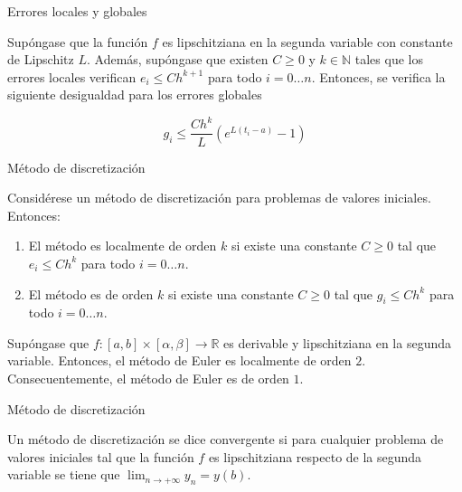 	
		\begin{frame}{Errores locales y globales}	
			\begin{theorem} \label{theorem:local-global-error}
				Supóngase que la función $f$ es lipschitziana en la segunda variable con constante de Lipschitz $L$. Además, supóngase que existen $C \ge 0$ y $k \in \mathbb{N}$ tales que los errores locales verifican $e_i \le C h^{k+1}$ para todo $i = 0 \ldots n$. Entonces, se verifica la siguiente desigualdad para los errores globales
						
				\begin{equation}
					g_i \le \frac{C h^k}{L} (e^{L(t_i-a)}-1)
				\end{equation}
			\end{theorem}
		\end{frame}	 
		
		\begin{frame}{Método de discretización}
			\fontsize{11}{11}\selectfont
			\begin{definition}
				Considérese un método de discretización para problemas de valores iniciales. Entonces:
				\begin{enumerate}
					\item El método es localmente de orden $k$ si existe una constante $C \ge 0$ tal que $e_i \le C h^k$ para todo $i = 0 \ldots n$.
					\item El método es de orden $k$ si existe una constante $C \ge 0$ tal que $g_i \le C h^k$ para todo $i = 0 \ldots n$.
				\end{enumerate}
			\end{definition}
			
			\begin{theorem} \label{theorem:euler:error}
				Supóngase que $f: [a,b] \times [\alpha, \beta] \rightarrow \mathbb{R}$ es derivable y lipschitziana en la segunda variable. Entonces, el método de Euler es localmente de orden $2$. Consecuentemente, el método de Euler es de orden $1$.
			\end{theorem}	
		\end{frame}
			
		\begin{frame}{Método de discretización}		
			\begin{definition}
				Un método de discretización se dice convergente si para cualquier problema de valores iniciales tal que la función $f$ es lipschitziana respecto de la segunda variable se tiene que $\lim_{n \rightarrow +\infty} y_n = y(b)$.
			\end{definition}
		\end{frame}	
			
